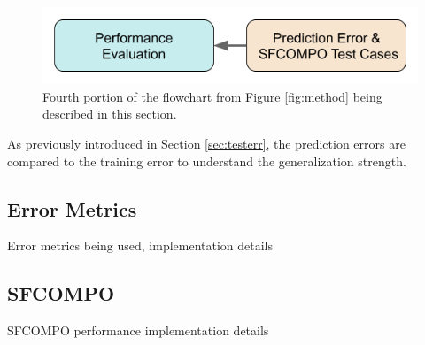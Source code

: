 
\begin{figure}[H]
  \centering
  \includegraphics[width=0.7\linewidth]{./chapters/exp1/methodology4.png}
  \caption{Fourth portion of the flowchart from Figure \ref{fig:method} being 
           described in this section.}
\end{figure}

As previously introduced in Section \ref{sec:testerr}, the prediction errors
are compared to the training error to understand the generalization strength. 

\subsection{Error Metrics}
Error metrics being used, implementation details

\subsection{SFCOMPO}
SFCOMPO performance implementation details

